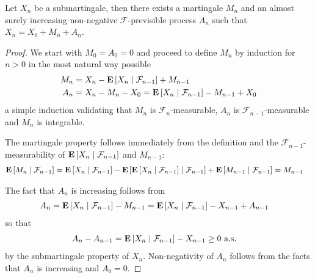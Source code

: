 \begin{lem}\label{DoobDecompositionDiscrete}Let
  $X_n$ be a submartingale, then there exists a martingale $M_n$ and
  an almost surely increasing non-negative $\mathcal{F}$-previsible process $A_n$ such that $X_n
  = X_0 + M_n + A_n$.
\end{lem}
\begin{proof}
We start with $M_0 = A_0 = 0$ and proceed to define $M_n$ by induction
for $n >0$ in the most natural way possible
\begin{align*}
M_n &= X_n - \cexpectationlong{\mathcal{F}_{n-1}}{X_n} + M_{n-1} \\
A_n &= X_n - M_n - X_0 = \cexpectationlong{\mathcal{F}_{n-1}}{X_n} - M_{n-1}
+ X_0
\end{align*}
a simple induction validating that $M_n$ is
$\mathcal{F}_n$-measurable, $A_n$ is $\mathcal{F}_{n-1}$-measurable
and $M_n$ is integrable.

The martingale property follows immediately from the definition and
the $\mathcal{F}_{n-1}$-measurability of
$\cexpectationlong{\mathcal{F}_{n-1}}{X_n}$ and $M_{n-1}$:
\begin{align*}
\cexpectationlong{\mathcal{F}_{n-1}}{M_n} &=
\cexpectationlong{\mathcal{F}_{n-1}}{X_n} -
\cexpectationlong{\mathcal{F}_{n-1}}{\cexpectationlong{\mathcal{F}_{n-1}} {X_n}} + 
\cexpectationlong{\mathcal{F}_{n-1}}{M_{n-1}} =M_{n-1}
\end{align*}

The fact that $A_n$ is increasing follows from
\begin{align*}
A_n &= \cexpectationlong{\mathcal{F}_{n-1}}{X_n} - M_{n-1} =
\cexpectationlong{\mathcal{F}_{n-1}}{X_n} - X_{n-1} + A_{n-1}
\end{align*}
so that 
\begin{align*}
A_n - A_{n-1} &= \cexpectationlong{\mathcal{F}_{n-1}}{X_n} - X_{n-1}
\geq 0 \text{ a.s.}
\end{align*}
by the submartingale property of $X_n$.  Non-negativity of $A_n$
follows from the facts that $A_n$ is increasing and $A_0 = 0$.
\end{proof}

